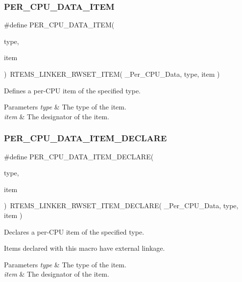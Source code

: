 \subsubsection{\texorpdfstring{PER\_CPU\_DATA\_ITEM}{PER\_CPU\_DATA\_ITEM}}
{\footnotesize\ttfamily \#define P\+E\+R\+\_\+\+C\+P\+U\+\_\+\+D\+A\+T\+A\+\_\+\+I\+T\+EM(\begin{DoxyParamCaption}\item[{}]{type,  }\item[{}]{item }\end{DoxyParamCaption})~R\+T\+E\+M\+S\+\_\+\+L\+I\+N\+K\+E\+R\+\_\+\+R\+W\+S\+E\+T\+\_\+\+I\+T\+EM( \+\_\+\+Per\+\_\+\+C\+P\+U\+\_\+\+Data, type, item )}



Defines a per-\/\+C\+PU item of the specified type. 


\begin{DoxyParams}{Parameters}
{\em type} & The type of the item. \\
\hline
{\em item} & The designator of the item. \\
\hline
\end{DoxyParams}
\mbox{\label{group__PerCPUData_gaeceb44ec5ecddd9d2a7e93b2cb4c5333}} 
\subsubsection{\texorpdfstring{PER\_CPU\_DATA\_ITEM\_DECLARE}{PER\_CPU\_DATA\_ITEM\_DECLARE}}
{\footnotesize\ttfamily \#define P\+E\+R\+\_\+\+C\+P\+U\+\_\+\+D\+A\+T\+A\+\_\+\+I\+T\+E\+M\+\_\+\+D\+E\+C\+L\+A\+RE(\begin{DoxyParamCaption}\item[{}]{type,  }\item[{}]{item }\end{DoxyParamCaption})~R\+T\+E\+M\+S\+\_\+\+L\+I\+N\+K\+E\+R\+\_\+\+R\+W\+S\+E\+T\+\_\+\+I\+T\+E\+M\+\_\+\+D\+E\+C\+L\+A\+RE( \+\_\+\+Per\+\_\+\+C\+P\+U\+\_\+\+Data, type, item )}



Declares a per-\/\+C\+PU item of the specified type. 

Items declared with this macro have external linkage.


\begin{DoxyParams}{Parameters}
{\em type} & The type of the item. \\
\hline
{\em item} & The designator of the item. \\
\hline
\end{DoxyParams}
\mbox{\label{group__PerCPUData_gaea23d946a72e70c72bad510257f9aae3}} 
